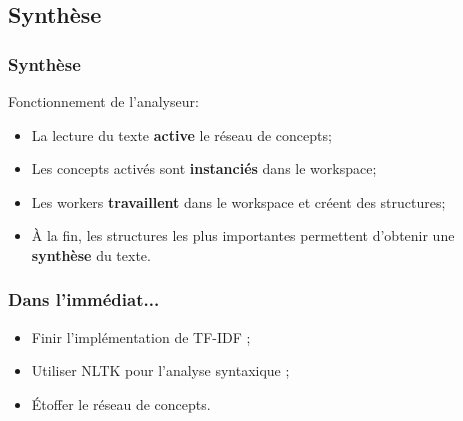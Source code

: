 \documentclass{beamer}
\begin{document}
    \subsection{Synthèse}
        \begin{frame}
        \frametitle{Synthèse}
            Fonctionnement de l'analyseur:
            \begin{itemize}
                \item La lecture du texte \textbf{active} le réseau de concepts;
                \item Les concepts activés sont \textbf{instanciés} dans le workspace;
                \item Les workers \textbf{travaillent} dans le workspace et créent des structures;
                \item À la fin, les structures les plus importantes permettent d'obtenir une \textbf{synthèse} du texte.
            \end{itemize}
        \end{frame}

\begin{frame}
	\frametitle{Dans l'immédiat...}
	\begin{itemize}
		\item Finir l'implémentation de TF-IDF ;
		\item Utiliser NLTK pour l'analyse syntaxique ;
		\item Étoffer le réseau de concepts.
	\end{itemize}
\end{frame}
\end{document}
